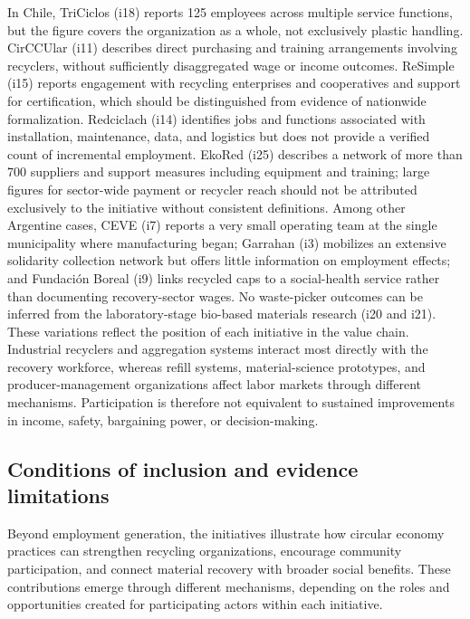 \documentclass[
  12pt,
  oneside]{book}
\begin{document}
In Chile, TriCiclos (i18) reports 125 employees across multiple service
functions, but the figure covers the organization as a whole, not
exclusively plastic handling. CirCCUlar (i11) describes direct
purchasing and training arrangements involving recyclers, without
sufficiently disaggregated wage or income outcomes. ReSimple (i15)
reports engagement with recycling enterprises and cooperatives and
support for certification, which should be distinguished from evidence
of nationwide formalization. Redciclach (i14) identifies jobs and
functions associated with installation, maintenance, data, and logistics
but does not provide a verified count of incremental employment. EkoRed
(i25) describes a network of more than 700 suppliers and support
measures including equipment and training; large figures for sector-wide
payment or recycler reach should not be attributed exclusively to the
initiative without consistent definitions. Among other Argentine cases,
CEVE (i7) reports a very small operating team at the single municipality
where manufacturing began; Garrahan (i3) mobilizes an extensive
solidarity collection network but offers little information on
employment effects; and Fundación Boreal (i9) links recycled caps to a
social-health service rather than documenting recovery-sector wages. No
waste-picker outcomes can be inferred from the laboratory-stage
bio-based materials research (i20 and i21). These variations reflect the
position of each initiative in the value chain. Industrial recyclers and
aggregation systems interact most directly with the recovery workforce,
whereas refill systems, material-science prototypes, and
producer-management organizations affect labor markets through different
mechanisms. Participation is therefore not equivalent to sustained
improvements in income, safety, bargaining power, or decision-making.

\subsection{Conditions of inclusion and evidence
limitations}\label{conditions-of-inclusion-and-evidence-limitations}

Beyond employment generation, the initiatives illustrate how circular
economy practices can strengthen recycling organizations, encourage
community participation, and connect material recovery with broader
social benefits. These contributions emerge through different
mechanisms, depending on the roles and opportunities created for
participating actors within each initiative.
\end{document}
